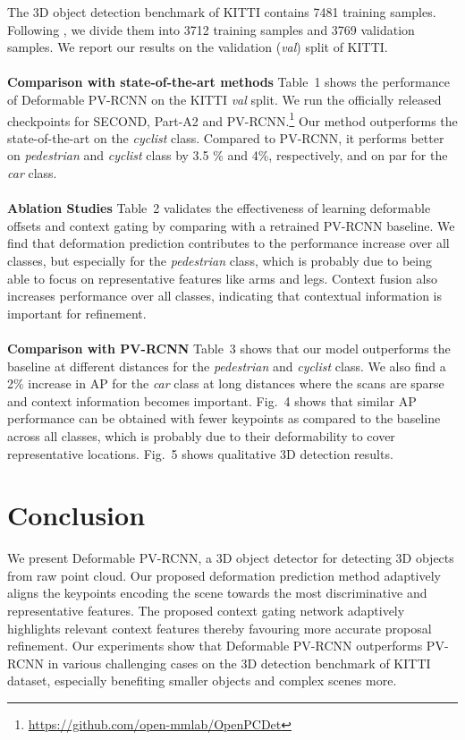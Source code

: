 \documentclass[runningheads]{llncs}
\begin{document}
The 3D object detection benchmark of KITTI \cite{KITTI} contains 7481 training samples. Following \cite{MV3D}, we divide them into 3712 training samples and 3769 validation samples. We report our results on the validation (\textit{val}) split of KITTI. \\ \\
\textbf{Comparison with state-of-the-art methods}  Table~1 shows the performance of Deformable PV-RCNN on the KITTI \textit{val} split. We run the officially released checkpoints for SECOND, Part-A2 and PV-RCNN.\footnote{\url{https://github.com/open-mmlab/OpenPCDet}} Our method outperforms the state-of-the-art on the \textit{cyclist} class. Compared to PV-RCNN, it performs better on \textit{pedestrian} and \textit{cyclist} class by 3.5 \% and 4\%, respectively, and on par for the \textit{car} class. \\ \\
\textbf{Ablation Studies} Table~2 validates the effectiveness of learning deformable offsets and context gating by comparing with a retrained PV-RCNN baseline. We find that deformation prediction contributes to the performance increase over all classes, but especially for the \textit{pedestrian} class, which is probably due to being able to focus on representative features like arms and legs. Context fusion also increases performance over all classes, indicating that contextual information is important for refinement. \\ \\
\textbf{Comparison with PV-RCNN} Table~3 shows that our model outperforms the baseline at different distances for the \textit{pedestrian} and \textit{cyclist} class. We also find a 2\% increase in AP for the \textit{car} class at long distances where the scans are sparse and context information becomes important.  Fig.~4 shows that similar AP performance can be obtained with fewer keypoints as compared to the baseline across all classes, which is probably due to their deformability to cover representative locations. Fig.~5 shows qualitative 3D detection results.

\section{Conclusion}
We present Deformable PV-RCNN, a 3D object detector for detecting 3D objects from raw point cloud.  Our proposed deformation prediction method adaptively aligns the keypoints encoding the scene towards the most discriminative and representative features. The proposed context gating network adaptively highlights relevant context features thereby favouring more accurate proposal refinement. Our experiments show that Deformable PV-RCNN outperforms PV-RCNN in various challenging cases on the 3D detection benchmark of KITTI dataset, especially benefiting smaller objects and complex scenes more.
\end{document}
